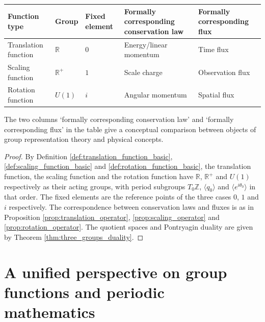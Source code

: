 \begin{corollary}\label{cor:three_functions_trinity}
\begin{center}
\small
\setlength{\tabcolsep}{3pt}
\begin{tabular}{>{\centering\arraybackslash}p{2.2cm}>{\centering\arraybackslash}p{2cm}>{\centering\arraybackslash}p{1.8cm}>{\centering\arraybackslash}p{2.2cm}>{\centering\arraybackslash}p{2.2cm}}
\toprule
Function type & Group & Fixed element & Formally corresponding conservation law & Formally corresponding flux \\
\midrule
Translation function & $\mathbb{R}$ & $0$ & Energy/\allowbreak linear momentum & Time flux \\
Scaling function & $\mathbb{R}^+$ & $1$ & Scale charge & Observation flux \\
Rotation function & $U(1)$ & $i$ & Angular momentum & Spatial flux \\
\bottomrule
\end{tabular}
\end{center}
The two columns `formally corresponding conservation law' and `formally corresponding flux' in the table give a conceptual comparison between objects of group representation theory and physical concepts.
\end{corollary}

\begin{proof}
By Definition \ref{def:translation_function_basic}, \ref{def:scaling_function_basic} and \ref{def:rotation_function_basic}, the translation function, the scaling function and the rotation function have $\mathbb{R}$, $\mathbb{R}^+$ and $U(1)$ respectively as their acting groups, with period subgroups $T_0\mathbb{Z}$, $\langle q_0\rangle$ and $\langle e^{i\theta_0}\rangle$ in that order. The fixed elements are the reference points of the three cases $0$, $1$ and $i$ respectively. The correspondence between conservation laws and fluxes is as in Proposition \ref{prop:translation_operator}, \ref{prop:scaling_operator} and \ref{prop:rotation_operator}. The quotient spaces and Pontryagin duality are given by Theorem \ref{thm:three_groups_duality}.
\end{proof}

\section{\texorpdfstring{A unified perspective on group functions and periodic mathematics}{A unified perspective on group functions and periodic mathematics}}

